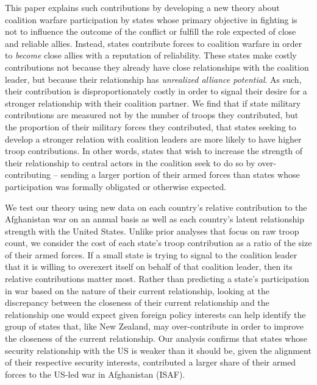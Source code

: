 \documentclass[12pt,letterpaper]{article}
\begin{document}
	This paper explains such contributions by developing a new theory about coalition warfare participation by states whose primary objective in fighting is not to influence the outcome of the conflict or fulfill the role expected of close and reliable allies. Instead, states contribute forces to coalition warfare in order to \textit{become} close allies with a reputation of reliability. These states make costly contributions not because they already have close relationships with the coalition leader, but because their relationship has \textit{unrealized alliance potential}. As such, their contribution is disproportionately costly in order to signal their desire for a stronger relationship with their coalition partner. We find that if state military contributions are measured not by the number of troops they contributed, but the proportion of their military forces they contributed, that states seeking to develop a stronger relation with coalition leaders are more likely to have higher troop contributions. In other words, states that wish to increase the strength of their relationship to central actors in the coalition seek to do so by over-contributing -- sending a larger portion of their armed forces than states whose participation was formally obligated or otherwise expected.
	
	We test our theory using new data on each country's relative contribution to the Afghanistan war on an annual basis as well as each country's latent relationship strength with the United States. Unlike prior analyses that focus on raw troop count, we consider the cost of each state's troop contribution as a ratio of the size of their armed forces. If a small state is trying to signal to the coalition leader that it is willing to overexert itself on behalf of that coalition leader, then its relative contributions matter most. Rather than predicting a state's participation in war based on the nature of their current relationship, looking at the discrepancy between the closeness of their current relationship and the relationship one would expect given foreign policy interests can help identify the group of states that, like New Zealand, may over-contribute in order to improve the closeness of the current relationship. Our analysis confirms that states whose security relationship with the US is weaker than it should be, given the alignment of their respective security interests, contributed a larger share of their armed forces to the US-led war in Afghanistan (ISAF).
	
\end{document}
